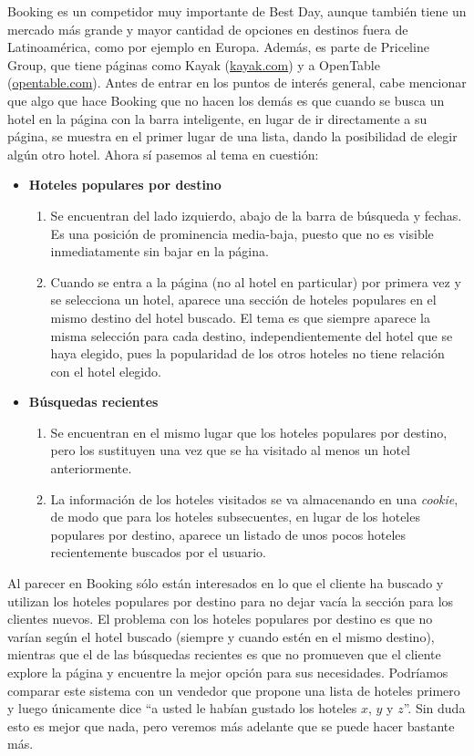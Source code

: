 \documentclass[12pt]{report}
\begin{document}
Booking es un competidor muy importante de Best Day, aunque también tiene un mercado más grande y mayor cantidad de opciones en destinos fuera de Latinoamérica, como por ejemplo en Europa. Además, es parte de Priceline Group, que tiene páginas como Kayak (\url{kayak.com}) y a OpenTable (\url{opentable.com}). Antes de entrar en los puntos de interés general, cabe mencionar que algo que hace Booking que no hacen los demás es que cuando se busca un hotel en la página con la barra inteligente, en lugar de ir directamente a su página, se muestra en el primer lugar de una lista, dando la posibilidad de elegir algún otro hotel. Ahora sí pasemos al tema en cuestión:
\begin{itemize}
	\item \textbf{Hoteles populares por destino}
	\begin{enumerate}
		\item Se encuentran del lado izquierdo, abajo de la barra de búsqueda y fechas. Es una posición de prominencia media-baja, puesto que no es visible inmediatamente sin bajar en la página.
		\item Cuando se entra a la página (no al hotel en particular) por primera vez y se selecciona un hotel, aparece una sección de hoteles populares en el mismo destino del hotel buscado. El tema es que siempre aparece la misma selección para cada destino, independientemente del hotel que se haya elegido, pues la popularidad de los otros hoteles no tiene relación con el hotel elegido.
	\end{enumerate}
	\item \textbf{Búsquedas recientes}
	\begin{enumerate}
		\item Se encuentran en el mismo lugar que los hoteles populares por destino, pero los sustituyen una vez que se ha visitado al menos un hotel anteriormente.
		\item La información de los hoteles visitados se va almacenando en una \emph{cookie}, de modo que para los hoteles subsecuentes, en lugar de los hoteles populares por destino, aparece un listado de unos pocos hoteles recientemente buscados por el usuario.
	\end{enumerate}
\end{itemize}
Al parecer en Booking sólo están interesados en lo que el cliente ha buscado y utilizan los hoteles populares por destino para no dejar vacía la sección para los clientes nuevos. El problema con los hoteles populares por destino es que no varían según el hotel buscado (siempre y cuando estén en el mismo destino), mientras que el de las búsquedas recientes es que no promueven que el cliente explore la página y encuentre la mejor opción para sus necesidades. Podríamos comparar este sistema con un vendedor que propone una lista de hoteles primero y luego únicamente dice ``a usted le habían gustado los hoteles $x$, $y$ y $z$''. Sin duda esto es mejor que nada, pero veremos más adelante que se puede hacer bastante más.
\end{document}
